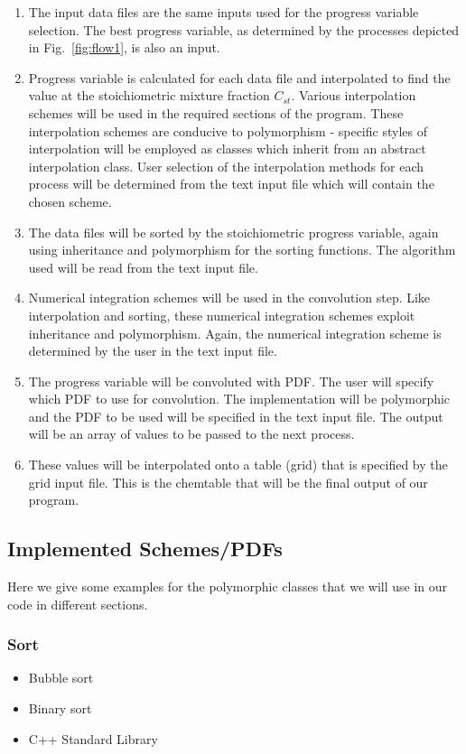 \documentclass[11pt]{article}
\begin{document}
\begin{enumerate}
\item The input data files are the same inputs used for the progress variable selection. The best progress variable, as determined by the processes depicted in Fig.~\ref{fig:flow1}, is also an input.  
\item Progress variable is calculated for each data file and interpolated to find the value at the stoichiometric mixture fraction $C_{st}$. Various interpolation schemes will be used in the required sections of the program.  These interpolation schemes are conducive to polymorphism - specific styles of interpolation will be employed as classes which inherit from an abstract interpolation class.  User selection of the interpolation methods for each process will be determined from the text input file which will contain the chosen scheme.
\item The data files will be sorted by the stoichiometric progress variable, again using inheritance and polymorphism for the sorting functions. The algorithm used will be read from the text input file.
\item Numerical integration schemes will be used in the convolution step.  Like interpolation and sorting, these numerical integration schemes exploit inheritance and polymorphism. Again, the numerical integration scheme is determined by the user in the text input file.
\item The progress variable will be convoluted with PDF. The user will specify which PDF to use for convolution.  The implementation will be polymorphic and the PDF to be used will be specified in the text input file.  The output will be an array of values to be passed to the next process.
\item These values will be interpolated onto a table (grid) that is specified by the grid input file.  This is the chemtable that will be the final output of our program.  
\end{enumerate}

\subsection{Implemented Schemes/PDFs}
Here we give some examples for the polymorphic classes that we will use in our code in different sections. 

\subsubsection{Sort}
\begin{itemize}
\item Bubble sort 
\item Binary sort
\item C++ Standard Library
\end{itemize}
\end{document}

